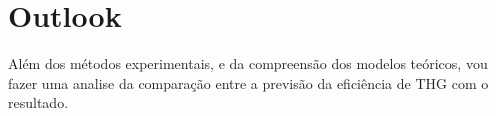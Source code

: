 \chapter{Outlook}
Além dos métodos experimentais, e da compreensão dos modelos teóricos, vou fazer uma analise da comparação entre a previsão da eficiência de THG com o resultado.  
